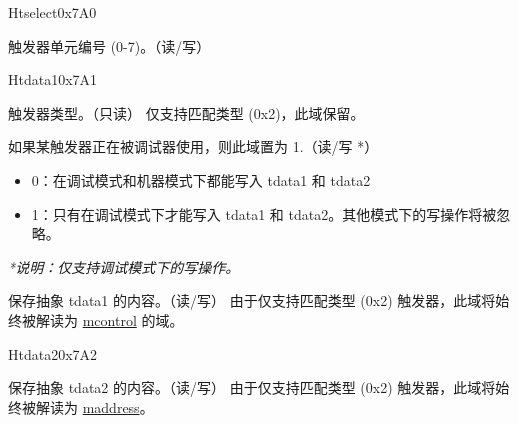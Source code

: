 
\begin{register}{H}{tselect}{0x7A0}\label{regdesc:TSELECT}
%
%
\regnewline%
\begin{regdesc}\begin{reglist}
\label{fielddesc:TSELECT}\item [tselect] 触发器单元编号 (0-7)。（读/写）
\end{reglist}\end{regdesc}
\end{register}

\begin{register}{H}{tdata1}{0x7A1}\label{regdesc:TDATA1}
%
%
%
\regnewline%
\begin{regdesc}\begin{reglist}
\label{fielddesc:TDATA1TYPE}\item [type] 触发器类型。（只读） \newline 仅支持匹配类型 (0x2)，此域保留。
\label{fielddesc:TDATA1DMODE}\item [dmode] 如果某触发器正在被调试器使用，则此域置为 1.（读/写 *）
\begin{itemize}
    \setlength\itemsep{-1em}
    \item 0：在调试模式和机器模式下都能写入 tdata1 和 tdata2
    \item 1：只有在调试模式下才能写入 tdata1 和 tdata2。其他模式下的写操作将被忽略。
\end{itemize}
\textit{*说明：仅支持调试模式下的写操作。}
\label{fielddesc:TDATA1DATA}\item [data] 保存抽象 tdata1 的内容。（读/写） \newline 由于仅支持匹配类型 (0x2) 触发器，此域将始终被解读为 \hyperref[regdesc:MCONTROL]{mcontrol} 的域。
\end{reglist}\end{regdesc}
\end{register}

\begin{register}{H}{tdata2}{0x7A2}\label{regdesc:TDATA2}
%
\regnewline%
\begin{regdesc}\begin{reglist}
\label{fielddesc:TDATA2}\item [tdata2] 保存抽象 tdata2 的内容。（读/写） \newline 由于仅支持匹配类型 (0x2) 触发器，此域将始终被解读为 \hyperref[regdesc:MADDRESS]{maddress}。
\end{reglist}\end{regdesc}
\end{register}

